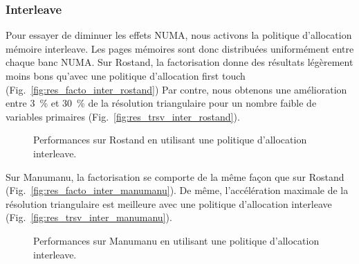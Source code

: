 \subsubsection{Interleave}
Pour essayer de diminuer les effets NUMA, nous activons la politique d'allocation mémoire interleave.
%
Les pages mémoires sont donc distribuées uniformément entre chaque banc NUMA.
%
Sur Rostand, la factorisation donne des résultats légèrement moins bons qu'avec une politique d'allocation first touch (Fig.~\ref{fig:res_facto_inter_rostand})
%
Par contre, nous obtenons une amélioration entre 3~\% et 30~\% de la résolution triangulaire pour un nombre faible de variables primaires (Fig.~\ref{fig:res_trsv_inter_rostand}).



\begin{figure}[!h]
     \begin{center}
    \end{center}
    \caption{Performances sur Rostand en utilisant une politique d'allocation interleave.}
\end{figure}



Sur Manumanu, la factorisation se comporte de la même façon que sur Rostand (Fig.~\ref{fig:res_facto_inter_manumanu}).
%
De même, l'accélération maximale de la résolution triangulaire est meilleure avec une politique d'allocation interleave (Fig.~\ref{fig:res_trsv_inter_manumanu}).





\begin{figure}[!h]
     \begin{center}
    \end{center}
    \caption{Performances sur Manumanu en utilisant une politique d'allocation interleave.}
\end{figure}
